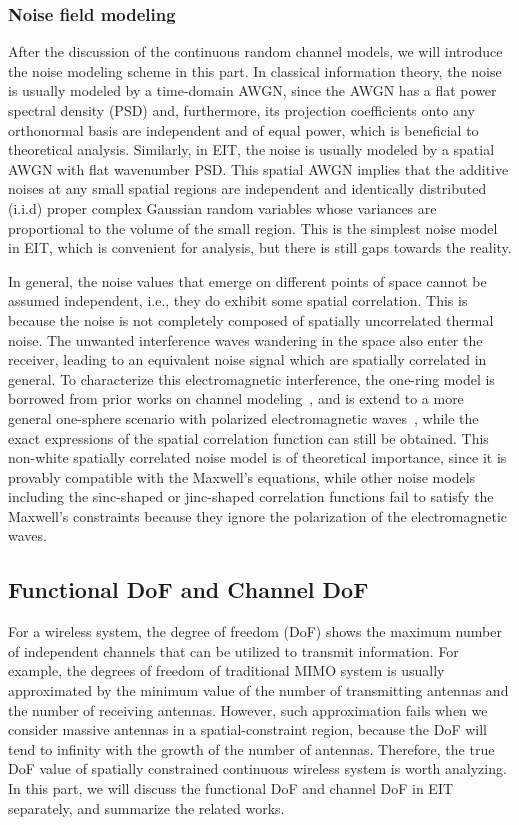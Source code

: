 \documentclass[journal,twocolumn]{IEEEtran}
\begin{document}
\subsubsection{Noise field modeling}
After the discussion of the continuous random channel models, we will introduce the noise modeling scheme in this part. In classical information theory, the noise is usually modeled by a time-domain AWGN, since the AWGN has a flat power spectral density (PSD) and, furthermore, its projection coefficients onto any orthonormal basis are independent and of equal power, which is beneficial to theoretical analysis. 
Similarly, in EIT, the noise is usually modeled by a spatial AWGN with flat wavenumber PSD. This spatial AWGN implies that the additive noises at any small spatial regions are independent and identically distributed (i.i.d) proper complex Gaussian random variables whose variances are proportional to the volume of the small region. This is the simplest noise model in EIT, which is convenient for analysis, but there is still gaps towards the reality. 

In general, the noise values that emerge on different points of space cannot be assumed independent, i.e., they do exhibit some spatial correlation. 
This is because the noise is not completely composed of spatially uncorrelated thermal noise. 
The unwanted interference waves wandering in the space also enter the receiver, leading to an equivalent noise signal which are spatially correlated in general. 
To characterize this electromagnetic interference, the one-ring model is borrowed from prior works on channel modeling~\cite{patzold2004space}, and is extend to a more general one-sphere scenario with polarized electromagnetic waves~\cite{wan2022mutual}, while the exact expressions of the spatial correlation function can still be obtained. 
This non-white spatially correlated noise model is of theoretical importance, since it is provably compatible with the Maxwell's equations, while other noise models including the sinc-shaped or jinc-shaped correlation functions fail to satisfy the Maxwell's constraints because they ignore the polarization of the electromagnetic waves. 


\subsection{Functional DoF and Channel DoF}
\label{Sec_3_Subsec_2}
For a wireless system, the degree of freedom (DoF) shows the maximum number of independent channels that can be utilized to transmit information. For example, the degrees of freedom of traditional MIMO system is usually approximated by the minimum value of the number of transmitting antennas and the number of receiving antennas. However, such approximation fails when we consider massive antennas in a spatial-constraint region, because the DoF will tend to infinity with the growth of the number of antennas. Therefore, the true DoF value of spatially constrained continuous wireless system is worth analyzing. In this part, we will discuss the functional DoF and channel DoF in EIT separately, and summarize the related works.
\end{document}

